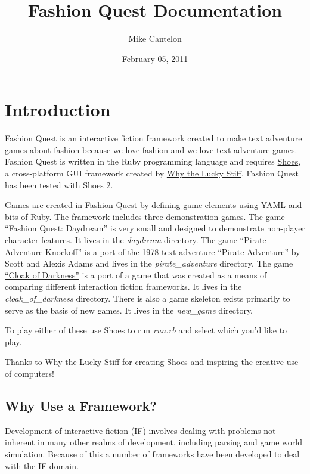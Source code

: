 \documentclass[letterpaper,10pt,english]{sphinxmanual}
\title{Fashion Quest Documentation}
\date{February 05, 2011}
\author{Mike Cantelon}
\begin{document}
\maketitle
\tableofcontents
{}\label{index::doc}



\chapter{Introduction}
\label{introduction:introduction}\label{introduction::doc}\label{introduction:fashion-quest}
Fashion Quest is an interactive fiction framework created to make \href{http://en.wikipedia.org/wiki/Interactive\_fiction}{text adventure games} about fashion because we love fashion and we love text adventure games. Fashion Quest is written in the Ruby programming language and requires \href{http://shoesrb.com/}{Shoes}, a cross-platform GUI framework created by \href{http://en.wikipedia.org/wiki/Why\_the\_lucky\_stiff/}{Why the Lucky Stiff}. Fashion Quest has been tested with Shoes 2.

Games are created in Fashion Quest by defining game elements using YAML and bits of Ruby. The framework includes three demonstration games. The game ``Fashion Quest: Daydream'' is very small and designed to demonstrate non-player character features. It lives in the \emph{daydream} directory. The game ``Pirate Adventure Knockoff'' is a port of the 1978 text adventure \href{http://en.wikipedia.org/wiki/Pirate\_Adventure}{``Pirate Adventure''} by Scott and Alexis Adams and lives in the \emph{pirate\_adventure} directory. The game \href{http://www.firthworks.com/roger/cloak/}{``Cloak of Darkness''} is a port of a game that was created as a means of comparing different interaction fiction frameworks. It lives in the \emph{cloak\_of\_darkness} directory. There is also a game skeleton exists primarily to serve as the basis of new games. It lives in the \emph{new\_game} directory.

To play either of these use Shoes to run \emph{run.rb} and select which you’d like to play.

Thanks to Why the Lucky Stiff for creating Shoes and inspiring the creative use of computers!


\section{Why Use a Framework?}
\label{introduction:why-use-a-framework}\label{introduction:cloak-of-darkness}
Development of interactive fiction (IF) involves dealing with problems not inherent in many other realms of development, including parsing and game world simulation. Because of this a number of frameworks have been developed to deal with the IF domain.
\end{document}
